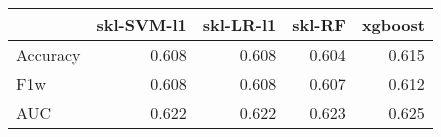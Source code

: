 \begin{tabular}{lrrrr}
\toprule
{} &  skl-SVM-l1 &  skl-LR-l1 &  skl-RF &  xgboost \\
\midrule
Accuracy &       0.608 &      0.608 &   0.604 &    0.615 \\
F1w      &       0.608 &      0.608 &   0.607 &    0.612 \\
AUC      &       0.622 &      0.622 &   0.623 &    0.625 \\
\bottomrule
\end{tabular}
